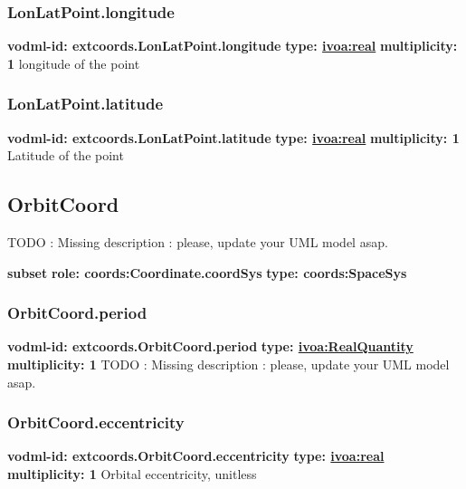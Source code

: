     \subsubsection{LonLatPoint.longitude}
      \textbf{vodml-id: extcoords.LonLatPoint.longitude} \newline
      \textbf{type: \hyperref[sect:ivoa]{ivoa:real}} \newline
      \textbf{multiplicity: 1} \newline 
      longitude of the point

    \subsubsection{LonLatPoint.latitude}
      \textbf{vodml-id: extcoords.LonLatPoint.latitude} \newline
      \textbf{type: \hyperref[sect:ivoa]{ivoa:real}} \newline
      \textbf{multiplicity: 1} \newline 
      Latitude of the point

  \subsection{OrbitCoord}
  \label{sect:extcoords.OrbitCoord}
    TODO : Missing description : please, update your UML model asap.

    \noindent \textbf{subset} \newline
    \indent   \textbf{role: coords:Coordinate.coordSys} \newline
    \indent   \textbf{type: coords:SpaceSys} \newline


    \subsubsection{OrbitCoord.period}
      \textbf{vodml-id: extcoords.OrbitCoord.period} \newline
      \textbf{type: \hyperref[sect:ivoa]{ivoa:RealQuantity}} \newline
      \textbf{multiplicity: 1} \newline 
      TODO : Missing description : please, update your UML model asap.

    \subsubsection{OrbitCoord.eccentricity}
      \textbf{vodml-id: extcoords.OrbitCoord.eccentricity} \newline
      \textbf{type: \hyperref[sect:ivoa]{ivoa:real}} \newline
      \textbf{multiplicity: 1} \newline 
      Orbital eccentricity, unitless

